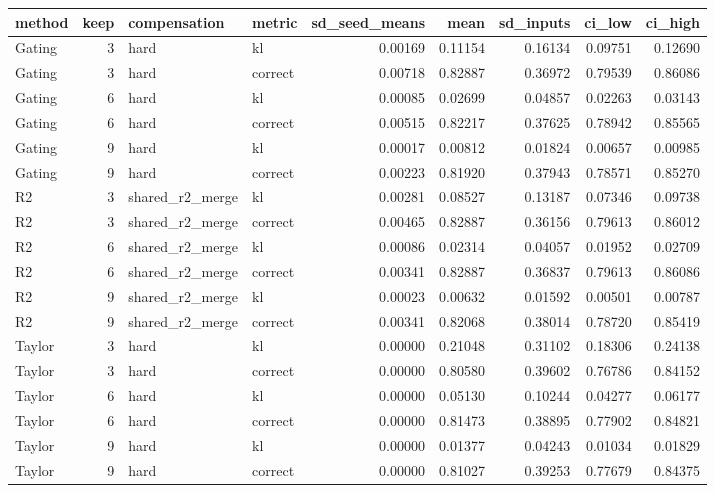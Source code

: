 \begin{tabular}{lrllrrrrr}
\toprule
method & keep & compensation & metric & sd_seed_means & mean & sd_inputs & ci_low & ci_high \\
\midrule
Gating & 3 & hard & kl & 0.00169 & 0.11154 & 0.16134 & 0.09751 & 0.12690 \\
Gating & 3 & hard & correct & 0.00718 & 0.82887 & 0.36972 & 0.79539 & 0.86086 \\
Gating & 6 & hard & kl & 0.00085 & 0.02699 & 0.04857 & 0.02263 & 0.03143 \\
Gating & 6 & hard & correct & 0.00515 & 0.82217 & 0.37625 & 0.78942 & 0.85565 \\
Gating & 9 & hard & kl & 0.00017 & 0.00812 & 0.01824 & 0.00657 & 0.00985 \\
Gating & 9 & hard & correct & 0.00223 & 0.81920 & 0.37943 & 0.78571 & 0.85270 \\
R2 & 3 & shared_r2_merge & kl & 0.00281 & 0.08527 & 0.13187 & 0.07346 & 0.09738 \\
R2 & 3 & shared_r2_merge & correct & 0.00465 & 0.82887 & 0.36156 & 0.79613 & 0.86012 \\
R2 & 6 & shared_r2_merge & kl & 0.00086 & 0.02314 & 0.04057 & 0.01952 & 0.02709 \\
R2 & 6 & shared_r2_merge & correct & 0.00341 & 0.82887 & 0.36837 & 0.79613 & 0.86086 \\
R2 & 9 & shared_r2_merge & kl & 0.00023 & 0.00632 & 0.01592 & 0.00501 & 0.00787 \\
R2 & 9 & shared_r2_merge & correct & 0.00341 & 0.82068 & 0.38014 & 0.78720 & 0.85419 \\
Taylor & 3 & hard & kl & 0.00000 & 0.21048 & 0.31102 & 0.18306 & 0.24138 \\
Taylor & 3 & hard & correct & 0.00000 & 0.80580 & 0.39602 & 0.76786 & 0.84152 \\
Taylor & 6 & hard & kl & 0.00000 & 0.05130 & 0.10244 & 0.04277 & 0.06177 \\
Taylor & 6 & hard & correct & 0.00000 & 0.81473 & 0.38895 & 0.77902 & 0.84821 \\
Taylor & 9 & hard & kl & 0.00000 & 0.01377 & 0.04243 & 0.01034 & 0.01829 \\
Taylor & 9 & hard & correct & 0.00000 & 0.81027 & 0.39253 & 0.77679 & 0.84375 \\
\bottomrule
\end{tabular}
